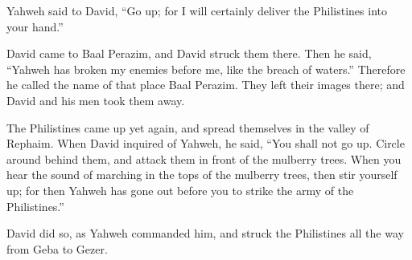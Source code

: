{\par }{\PP Yahweh said to David, “Go up; for I will certainly deliver the Philistines into your hand.”
\par }{\PP {}David came to Baal Perazim, and David struck them there. Then he said, “Yahweh has broken my enemies before me, like the breach of waters.” Therefore he called the name of that place Baal Perazim.
They left their images there; and David and his men took them away.
\par }{\PP {}The Philistines came up yet again, and spread themselves in the valley of Rephaim.
When David inquired of Yahweh, he said, “You shall not go up. Circle around behind them, and attack them in front of the mulberry trees.
When you hear the sound of marching in the tops of the mulberry trees, then stir yourself up; for then Yahweh has gone out before you to strike the army of the Philistines.”
\par }{\PP {}David did so, as Yahweh commanded him, and struck the Philistines all the way from Geba to Gezer.

}
